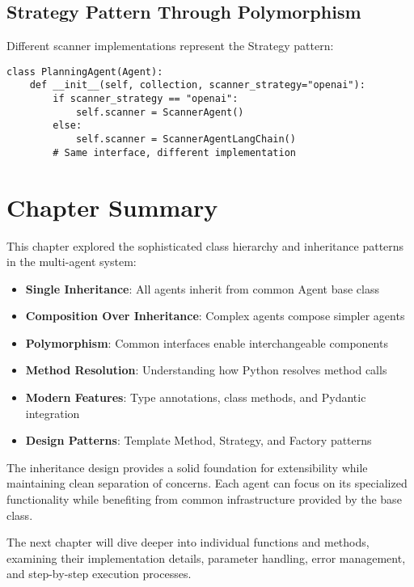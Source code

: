 \subsection{Strategy Pattern Through Polymorphism}

Different scanner implementations represent the Strategy pattern:

\begin{lstlisting}[caption=Strategy Pattern Implementation]
class PlanningAgent(Agent):
    def __init__(self, collection, scanner_strategy="openai"):
        if scanner_strategy == "openai":
            self.scanner = ScannerAgent()
        else:
            self.scanner = ScannerAgentLangChain()
        # Same interface, different implementation
\end{lstlisting}

\section{Chapter Summary}

This chapter explored the sophisticated class hierarchy and inheritance patterns in the multi-agent system:

\begin{itemize}
\item \textbf{Single Inheritance}: All agents inherit from common Agent base class
\item \textbf{Composition Over Inheritance}: Complex agents compose simpler agents
\item \textbf{Polymorphism}: Common interfaces enable interchangeable components
\item \textbf{Method Resolution}: Understanding how Python resolves method calls
\item \textbf{Modern Features}: Type annotations, class methods, and Pydantic integration
\item \textbf{Design Patterns}: Template Method, Strategy, and Factory patterns
\end{itemize}

The inheritance design provides a solid foundation for extensibility while maintaining clean separation of concerns. Each agent can focus on its specialized functionality while benefiting from common infrastructure provided by the base class.

The next chapter will dive deeper into individual functions and methods, examining their implementation details, parameter handling, error management, and step-by-step execution processes.